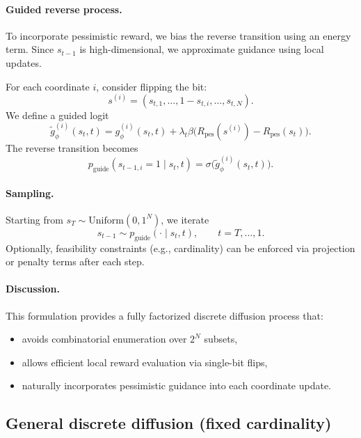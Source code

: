 \documentclass[11pt]{article}
\begin{document}
\paragraph{Guided reverse process.}
To incorporate pessimistic reward, we bias the reverse transition using an energy term. Since $s_{t-1}$ is high-dimensional, we approximate guidance using local updates.

For each coordinate $i$, consider flipping the bit:
\begin{equation*}
s^{(i)} =
(s_{t,1}, \dots, 1 - s_{t,i}, \dots, s_{t,N}).
\end{equation*}
We define a guided logit
\begin{equation*}
\tilde{g}_\phi^{(i)}(s_t, t)=g_\phi^{(i)}(s_t, t)
+
\lambda_t \beta \bigl(R_{\mathrm{pes}}(s^{(i)}) - R_{\mathrm{pes}}(s_t)\bigr).
\end{equation*}
The reverse transition becomes
\begin{equation*}
p_{\mathrm{guide}}(s_{t-1,i}=1 \mid s_t, t)=\sigma\bigl(\tilde{g}_\phi^{(i)}(s_t, t)\bigr).
\end{equation*}

\paragraph{Sampling.}
Starting from $s_T \sim \mathrm{Uniform}({0,1}^N)$, we iterate
\begin{equation*}
s_{t-1} \sim p_{\mathrm{guide}}(\cdot \mid s_t, t),
\qquad t = T, \dots, 1.
\end{equation*}
Optionally, feasibility constraints (e.g., cardinality) can be enforced via projection or penalty terms after each step.

\paragraph{Discussion.}
This formulation provides a fully factorized discrete diffusion process that:
\begin{itemize}[itemsep=-2pt, topsep=2pt]
\item avoids combinatorial enumeration over $2^N$ subsets,
\item allows efficient local reward evaluation via single-bit flips,
\item naturally incorporates pessimistic guidance into each coordinate update.
\end{itemize}

\subsection{General discrete diffusion (fixed cardinality)}
\end{document}
